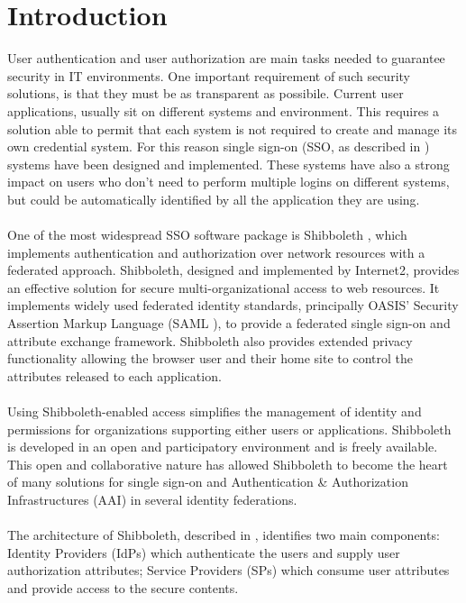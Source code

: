 \label{sec:introduction}
\section{Introduction}
User authentication and user authorization are main tasks needed to guarantee security in IT environments.
One important requirement of such security solutions, is that they must be as transparent as possibile.
Current user applications, usually sit on different systems and environment.
This requires a solution able to permit that each system is not required to create and manage its own credential system.
For this reason single sign-on (SSO, as described in \cite{Shaer-1995}) systems have been designed and implemented.
These systems have also a strong impact on users who don't need to perform multiple logins on different systems, but could be automatically
identified by all the application they are using.\\
\\
One of the most widespread SSO software package is Shibboleth \cite{Morgan-2004}, which implements authentication and authorization over
network resources with a federated approach.
Shibboleth, designed and implemented by Internet2, provides an effective solution for secure multi-organizational access to web resources.
It implements widely used federated identity standards, principally OASIS' Security Assertion Markup Language (SAML \cite{Cantor-2005}), to
provide a federated single sign-on and attribute exchange framework.
Shibboleth also provides extended privacy functionality allowing the browser user and their home site to control the attributes released to
each application.\\
\\
Using Shibboleth-enabled access simplifies the management of identity and permissions for organizations supporting either users or
applications.
Shibboleth is developed in an open and participatory environment and is freely available.
This open and collaborative nature has allowed Shibboleth to become the heart of many solutions for single sign-on and Authentication \&
Authorization Infrastructures (AAI) in several identity federations.\\
\\
The architecture of Shibboleth, described in \cite{Erdos-2005}, identifies two main components: Identity Providers (IdPs) which authenticate
the users and supply user authorization attributes; Service Providers (SPs) which consume user attributes and provide access to the secure
contents.\\
